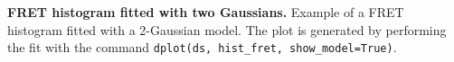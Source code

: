 \label{fig:histfit} \textbf{FRET histogram fitted with two Gaussians.}
Example of a FRET histogram fitted with a 2-Gaussian model.
The plot is generated by performing the fit with the command
\texttt{dplot(ds, hist\_fret, show\_model=True)}.
